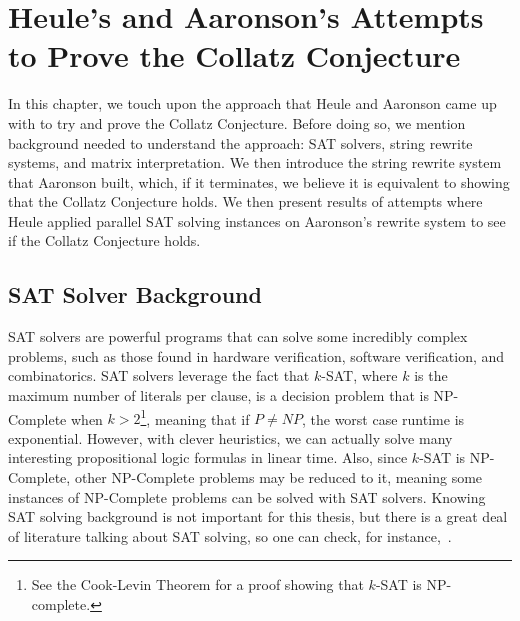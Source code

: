 \chapter{Heule's and Aaronson's Attempts to Prove the Collatz Conjecture} \label{sec:SRSandSAT}
In this chapter, we touch upon the approach that Heule and Aaronson came up with to try and prove the Collatz Conjecture. Before doing so, we mention background needed to understand the approach: SAT solvers, string rewrite systems, and matrix interpretation. We then introduce the string rewrite system that Aaronson built, which, if it terminates, we believe it is equivalent to showing that the Collatz Conjecture holds. We then present results of attempts where Heule applied parallel SAT solving instances on Aaronson's rewrite system to see if the Collatz Conjecture holds.
\section{SAT Solver Background}
SAT solvers are powerful programs that can solve some incredibly complex problems, such as those found in hardware verification, software verification, and combinatorics. SAT solvers leverage the fact that $k$-SAT, where $k$ is the maximum number of literals per clause, is a decision problem that is NP-Complete when $k > 2$\footnote{See the Cook-Levin Theorem for a proof showing that $k$-SAT is NP-complete.}, meaning that if $P \ne NP$, the worst case runtime is exponential. However, with clever heuristics, we can actually solve many interesting propositional logic formulas in linear time. Also, since $k$-SAT is NP-Complete, other NP-Complete problems may be reduced to it, meaning some instances of NP-Complete problems can be solved with SAT solvers. Knowing SAT solving background is not important for this thesis, but there is a great deal of literature talking about SAT solving, so one can check, for instance,~\cite{Biere:2009:HSV:1550723}.
